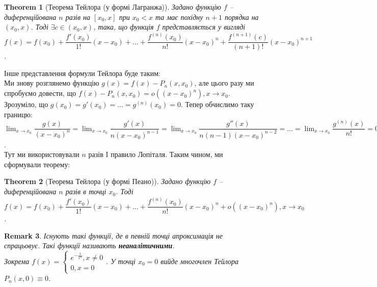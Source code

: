 \documentclass[a4paper, 14pt]{article}
\theoremstyle{theoremdd}
\newtheorem{theorem}{Theorem}[subsection]
\theoremstyle{theoremdd}
\theoremstyle{theoremdd}
\theoremstyle{theoremdd}
\theoremstyle{theoremdd}
\theoremstyle{theoremdd}
\newtheorem{remark}[theorem]{Remark}
\theoremstyle{theoremdd}
\theoremstyle{theoremdd}
\begin{document}
\begin{theorem}[Теорема Тейлора (у формі Лагранжа)]
Задано функцію $f$ -- диференційована $n$ разів на $[x_0,x]$ при $x_0 < x$ та має похідну $n+1$ порядка на $(x_0,x)$. Тоді $\exists c \in (x_0,x)$, така, що функція $f$ представляється у вигляді\\
$f(x) = f(x_0) + \dfrac{f'(x_0)}{1!}(x-x_0) + \dots + \dfrac{f^{(n)}(x_0)}{n!}(x-x_0)^n + \dfrac{f^{(n+1)}(c)}{(n+1)!}(x-x_0)^{n+1}$.
\end{theorem}

Інше представлення формули Тейлора буде таким:\\
Ми знову розглянемо функцію $g(x) = f(x) - P_n(x,x_0)$, але цього разу ми спробуємо довести, що $f(x) - P_n(x,x_0) = o((x-x_0)^n), x \to x_0$.\\
Зрозуміло, що $g(x_0) = g'(x_0) = \dots = g^{(n)}(x_0) = 0$. Тепер обчислимо таку границю:\\
$\displaystyle\lim_{x \to x_0} \dfrac{g(x)}{(x-x_0)^n} = \lim_{x \to x_0} \dfrac{g'(x)}{n(x-x_0)^{n-1}} = \lim_{x \to x_0} \dfrac{g''(x)}{n(n-1)(x-x_0)^{n-2}} = \dots = \lim_{x \to x_0} \dfrac{g^{(n)}(x)}{n!} = 0$.\\
Тут ми використовували $n$ разів I правило Лопіталя. Таким чином, ми сформували теорему:
\begin{theorem}[Теорема Тейлора (у формі Пеано)]
Задано функцію $f$ -- диференційована $n$ разів в точці $x_0$. Тоді \\
$f(x) = f(x_0) + \dfrac{f'(x_0)}{1!}(x-x_0) + \dots + \dfrac{f^{(n)}(x_0)}{n!}(x-x_0)^n + o((x-x_0)^n), x \to x_0$.
\end{theorem}

\begin{remark}
Існують такі функції, де в певній точці апроксимація не спрацьовує. Такі функції називають \textbf{неаналітичними}.\\
Зокрема $f(x) = \begin{cases} e^{\textstyle -\frac{1}{x^2}}, x \neq 0 \\ 0, x = 0 \end{cases}$. У точці $x_0 = 0$ вийде многочлен Тейлора $P_n(x,0) \equiv 0$.
\\ \iffalse %
\begin{figure}[H]
\centering
\begin{tikzpicture}
\draw[thick,->] (-2,0)--(2,0) node [anchor = north west] {$x$};
\draw[thick,->] (0,-0.2)--(0,1.5) node[anchor = east] {$y$};
\draw[red, domain=-2.1:-0.01, variable=\x, samples = 100] plot({\x}, {exp(-1/(\x)^2)});
\draw[red, domain=0.01:2.1, variable=\x, samples = 100] plot({\x}, {exp(-1/(\x)^2)});
\end{tikzpicture}
\end{figure}
\fi %
\end{remark}
\end{document}
